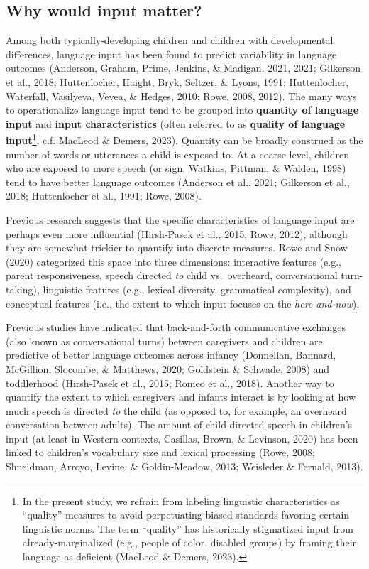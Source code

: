\documentclass[
  man]{apa6}
\begin{document}
\hypertarget{why-would-input-matter}{%
\subsection{Why would input matter?}\label{why-would-input-matter}}

Among both typically-developing children and children with developmental differences, language input has been found to predict variability in language outcomes (Anderson, Graham, Prime, Jenkins, \& Madigan, 2021, 2021; Gilkerson et al., 2018; Huttenlocher, Haight, Bryk, Seltzer, \& Lyons, 1991; Huttenlocher, Waterfall, Vasilyeva, Vevea, \& Hedges, 2010; Rowe, 2008, 2012). The many ways to operationalize language input tend to be grouped into \textbf{quantity of language input} and \textbf{input characteristics} (often referred to as \textbf{quality of language input}\footnote{In the present study, we refrain from labeling linguistic characteristics as ``quality'' measures to avoid perpetuating biased standards favoring certain linguistic norms. The term ``quality'' has historically stigmatized input from already-marginalized (e.g., people of color, disabled groups) by framing their language as deficient (MacLeod \& Demers, 2023).}, c.f. MacLeod \& Demers, 2023). Quantity can be broadly construed as the number of words or utterances a child is exposed to. At a coarse level, children who are exposed to more speech (or sign, Watkins, Pittman, \& Walden, 1998) tend to have better language outcomes (Anderson et al., 2021; Gilkerson et al., 2018; Huttenlocher et al., 1991; Rowe, 2008).

Previous research suggests that the specific characteristics of language input are perhaps even more influential (Hirsh-Pasek et al., 2015; Rowe, 2012), although they are somewhat trickier to quantify into discrete measures. Rowe and Snow (2020) categorized this space into three dimensions: interactive features (e.g., parent responsiveness, speech directed \emph{to} child vs.~overheard, conversational turn-taking), linguistic features (e.g., lexical diversity, grammatical complexity), and conceptual features (i.e., the extent to which input focuses on the \emph{here-and-now}).

Previous studies have indicated that back-and-forth communicative exchanges (also known as conversational turns) between caregivers and children are predictive of better language outcomes across infancy (Donnellan, Bannard, McGillion, Slocombe, \& Matthews, 2020; Goldstein \& Schwade, 2008) and toddlerhood (Hirsh-Pasek et al., 2015; Romeo et al., 2018). Another way to quantify the extent to which caregivers and infants interact is by looking at how much speech is directed \emph{to} the child (as opposed to, for example, an overheard conversation between adults). The amount of child-directed speech in children's input (at least in Western contexts, Casillas, Brown, \& Levinson, 2020) has been linked to children's vocabulary size and lexical processing (Rowe, 2008; Shneidman, Arroyo, Levine, \& Goldin-Meadow, 2013; Weisleder \& Fernald, 2013).
\end{document}
